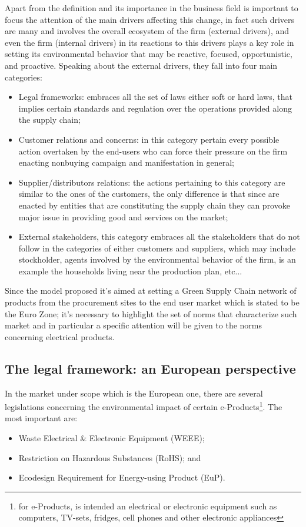 \begin{doublespace}
  Apart from the definition and its importance in the business field is important to focus the attention of the main drivers affecting this change, in fact such drivers are many and involves the overall ecosystem of the firm (external drivers), and even the firm (internal drivers) in its reactions to this drivers plays a key role in setting its environmental behavior that may be reactive, focused, opportunistic, and proactive\cite{YolLee2007}. Speaking about the external drivers, they fall into four main categories:
  \begin{itemize}
	  \item Legal frameworks: embraces all the set of laws either soft or hard laws, that implies certain standards and regulation over the operations provided along the supply chain;
	  \item Customer relations and concerns: in this category pertain every possible action overtaken by the end-users who can force their pressure on the firm enacting nonbuying campaign and manifestation in general;
	  \item Supplier/distributors relations: the actions pertaining to this category are similar to the ones of the customers, the only difference is that since are enacted    by entities that are constituting the supply chain they can provoke major issue in providing good and services on the market;
	  \item External stakeholders, this category embraces all the stakeholders that do not follow in the categories of either customers and suppliers, which may include stockholder, agents involved by the environmental behavior of the firm, is an example the households living near the production plan, etc...
  \end{itemize}
Since the model proposed it's aimed at setting a Green Supply Chain network of products from the procurement sites to the end user market which is stated to be the Euro Zone; it's necessary to highlight the set of norms that characterize such market and in particular a specific attention will be given to the norms concerning electrical products.

  \subsection{The legal framework: an European perspective}
  In the market under scope which is the European one, there are several legislations concerning the environmental impact of certain e-Products\footnote{for e-Products, is intended an electrical or electronic equipment such as computers, TV-sets, fridges, cell phones and other electronic appliances}. The most important are:
  \begin{itemize}
    \item Waste Electrical \& Electronic Equipment (WEEE);
    \item Restriction on Hazardous Substances (RoHS); and
    \item Ecodesign Requirement for Energy-using Product (EuP).
  \end{itemize}


\end{doublespace}
